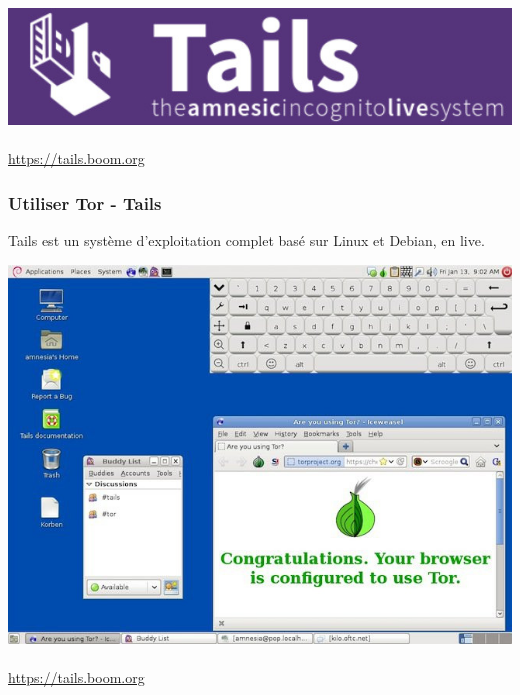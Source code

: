\documentclass{beamer}
\begin{document}
\begin{frame}
\begin{center}
\includegraphics[scale=0.3]{./images/tails_logo.jpg}
\\~\\
\url{https://tails.boom.org}
\end{center}
\end{frame}
\begin{frame}
\frametitle{Utiliser Tor - Tails}
Tails est un système d'exploitation complet basé sur Linux et Debian, en live.
\begin{center}
\includegraphics[scale=0.3]{./images/tails.jpg}
\\~\\
\url{https://tails.boom.org}
\end{center}
\end{frame}
\end{document}
